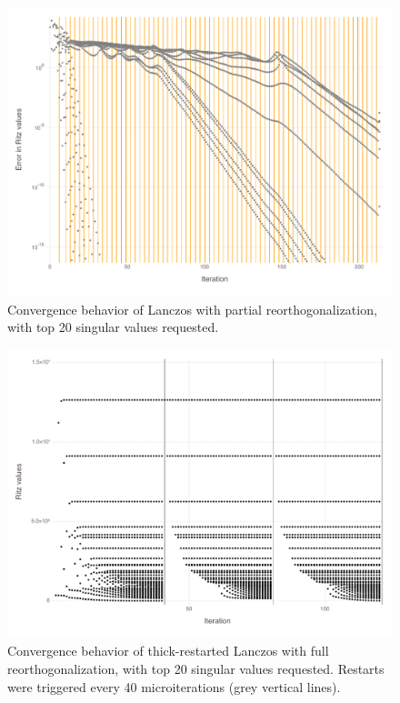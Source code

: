 \documentclass[review]{siamart0516}
\begin{document}
\begin{figure}
\caption{Convergence behavior of Lanczos with partial reorthogonalization, with top 20 singular values requested.
\label{fig:lanczos-tsvd}
}

\includegraphics[width=\textwidth]{fig/tsvdconv}
\end{figure}

\begin{figure}
\caption{Convergence behavior of thick-restarted Lanczos with full reorthogonalization, with top 20 singular values requested. Restarts were triggered every 40 microiterations (grey vertical lines).
\label{fig:lanczos-tr}
}

\includegraphics[width=\textwidth]{fig/thickrestarted/fig-conv}
\end{figure}
\end{document}
